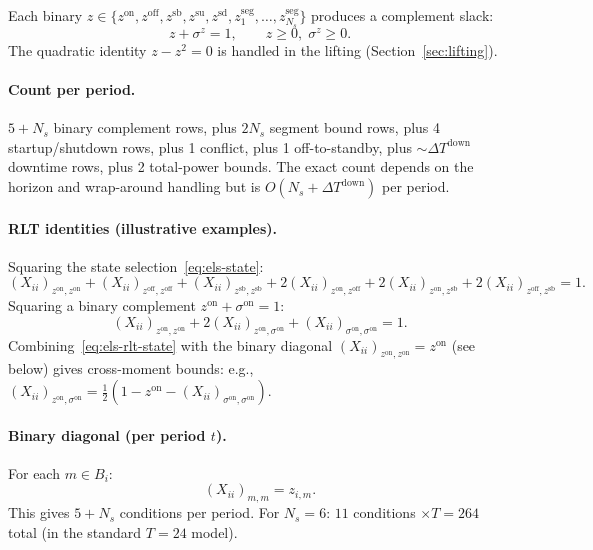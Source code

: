 \documentclass[11pt]{article}
\theoremstyle{definition}
\begin{document}
Each binary $z\in\{z^{\mathrm{on}},z^{\mathrm{off}},z^{\mathrm{sb}},
z^{\mathrm{su}},z^{\mathrm{sd}},z^{\mathrm{seg}}_1,\dots,
z^{\mathrm{seg}}_{N_s}\}$ produces a complement slack:
\begin{equation}
z+\sigma^z=1,\qquad z\ge0,\;\sigma^z\ge0.
\label{eq:els-bin-complement}
\end{equation}
The quadratic identity $z-z^2=0$ is handled in the lifting
(Section~\ref{sec:lifting}).

\paragraph{Count per period.}
$5+N_s$ binary complement rows, plus $2N_s$ segment bound rows, plus 4
startup/shutdown rows, plus 1 conflict, plus 1 off-to-standby, plus
$\sim\!\Delta T^{\mathrm{down}}$ downtime rows, plus 2 total-power
bounds.  The exact count depends on the horizon and wrap-around handling
but is $O(N_s+\Delta T^{\mathrm{down}})$ per period.

\paragraph{RLT identities (illustrative examples).}

Squaring the state selection~\eqref{eq:els-state}:
\begin{equation}
(X_{ii})_{z^{\mathrm{on}},z^{\mathrm{on}}}
+(X_{ii})_{z^{\mathrm{off}},z^{\mathrm{off}}}
+(X_{ii})_{z^{\mathrm{sb}},z^{\mathrm{sb}}}
+2(X_{ii})_{z^{\mathrm{on}},z^{\mathrm{off}}}
+2(X_{ii})_{z^{\mathrm{on}},z^{\mathrm{sb}}}
+2(X_{ii})_{z^{\mathrm{off}},z^{\mathrm{sb}}}
=1.
\label{eq:els-rlt-state}
\end{equation}
Squaring a binary complement $z^{\mathrm{on}}+\sigma^{\mathrm{on}}=1$:
\begin{equation}
(X_{ii})_{z^{\mathrm{on}},z^{\mathrm{on}}}
+2(X_{ii})_{z^{\mathrm{on}},\sigma^{\mathrm{on}}}
+(X_{ii})_{\sigma^{\mathrm{on}},\sigma^{\mathrm{on}}}=1.
\label{eq:els-rlt-comp}
\end{equation}
Combining~\eqref{eq:els-rlt-state} with the binary diagonal
$(X_{ii})_{z^{\mathrm{on}},z^{\mathrm{on}}}=z^{\mathrm{on}}$ (see
below) gives cross-moment bounds: e.g.,
$(X_{ii})_{z^{\mathrm{on}},\sigma^{\mathrm{on}}}
=\tfrac{1}{2}(1-z^{\mathrm{on}}-(X_{ii})_{\sigma^{\mathrm{on}},\sigma^{\mathrm{on}}})$.

\paragraph{Binary diagonal (per period $t$).}
For each $m\in B_i$:
\begin{equation}
(X_{ii})_{m,m}=z_{i,m}.
\label{eq:els-bindiag}
\end{equation}
This gives $5+N_s$ conditions per period.  For $N_s=6$: $11$ conditions
$\times T=264$ total (in the standard $T=24$ model).
\end{document}
